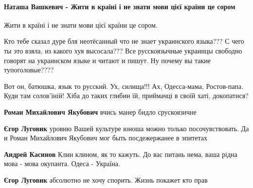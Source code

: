  
 
 
 
 
\paragraph{Наташа Вашкевич - Жити в країні і не знати мови цієї країни це сором}
\label{sec:18_06_2020.fb.zharkih_ekaterina.1.mova_jazyk.cmt.vashkevich_mova_sram_kraina}

\begin{itemize}

Жити в країні і не знати мови цієї країни це сором.

\begin{itemize}
Кто тебе сказал дуре бля неотёсанный что не знает украинского языка??? С чего ты это взяла, из какого хуя высосала??? Все русскоязычные украинцы свободно говорят на украинском языке и читают и пишут. Ну почему вы такие тупоголовые????

Вот он, батюшка, язык то русский. Ух, силища!!! Ах, Одесса-мама, Ростов-папа. Куди там солов'їній! Хіба до таких глибин їй, приймачці в своїй хаті, докопатися?

\textbf{Роман Михайлович Якубович} вчись манер бидло срускоязичне

\textbf{Єгор Луговик} уровню Вашей культуре юноша можно только посочувствовать.
Да и Роман Михайлович Якубович мог быть посдежержанее в эпитетах

\textbf{Андрей Касинов} Клин клином, як то кажуть. До вас питань нема, ваша рідна мова - мова окупанта. Одеса - Україна.

\textbf{Єгор Луговик} абсолютно не хочу спорить. Жизнь покажет кто прав


\end{itemize}
\end{itemize}
